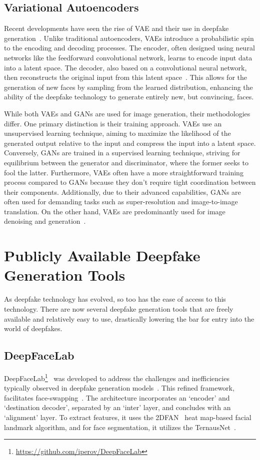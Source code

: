 \subsection{Variational Autoencoders}
Recent developments have seen the rise of \ac{VAE} and their use in deepfake
generation~\cite{kingma2022autoencoding}. Unlike traditional autoencoders, \ac{VAE}s introduce
a probabilistic spin to the encoding and decoding processes. The encoder, often
designed using neural networks like the feedforward convolutional network,
learns to encode input data into a latent space. The decoder, also based
on a convolutional neural network, then reconstructs the original input
from this latent space~\cite{vae-gan}. This allows for the
generation of new faces by sampling from the learned distribution, enhancing the
ability of the deepfake technology to generate entirely new, but convincing, faces.

While both \ac{VAE}s and \ac{GAN}s are used for image generation, their methodologies differ.
One primary distinction is their training approach. \ac{VAE}s use an unsupervised learning
technique, aiming to maximize the likelihood of the generated output relative to the
input and compress the input into a latent space. Conversely, \ac{GAN}s are trained
in a supervised learning technique, striving for equilibrium between the generator
and discriminator, where the former seeks to fool the latter. Furthermore, \ac{VAE}s
often have a more straightforward training process compared to \ac{GAN}s because they
don't require tight coordination between their components. Additionally, due to their
advanced capabilities, \ac{GAN}s are often used for demanding tasks such as
super-resolution and image-to-image translation. On the other hand, \ac{VAE}s are
predominantly used for image denoising and generation~\cite{vae-gan}.

\section{Publicly Available Deepfake Generation Tools}\label{chapter:publicly}
As deepfake technology has evolved, so too has the ease of access to this technology.
There are now several deepfake generation tools that are freely available and relatively
easy to use, drastically lowering the bar for entry into the world of deepfakes.

\subsection{DeepFaceLab}
DeepFaceLab\footnote{\url{https://github.com/iperov/DeepFaceLab}}~\cite{perov2021deepfacelab,10.1117/12.2631297}
was developed to address the challenges and inefficiencies typically
observed in deepfake generation models~\cite{s22124556}. This refined framework,
facilitates face-swapping~\cite{perov2021deepfacelab}. The architecture incorporates
an `encoder' and `destination decoder', separated by an `inter' layer, and
concludes with an `alignment' layer. To extract features, it uses the 2DFAN~\cite{Bulat_2017}
heat map-based facial landmark algorithm, and for face segmentation,
it utilizes the TernausNet~\cite{iglovikov2018ternausnet}.

